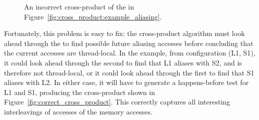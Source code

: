\begin{figure}
  \caption{An incorrect cross-product of the {\StateMachines} in
    Figure~\ref{fig:cross_product:example_aliasing}.}
  \label{fig:incorrect_cross_product}
\end{figure}

Fortunately, this problem is easy to fix: the cross-product algorithm
must look ahead through the {\StateMachines} to find possible future
aliasing accesses before concluding that the current accesses are
thread-local.  In the example, from configuration (L1, S1), it could
look ahead through the second {\StateMachine} to find that L1 aliases
with S2, and is therefore not thread-local, or it could look ahead
through the first {\StateMachine} to find that S1 aliases with L2.  In
either case, it will have to generate a happens-before test for L1 and
S1, producing the cross-product {\StateMachine} shown in
Figure~\ref{fig:correct_cross_product}.  This {\StateMachine}
correctly captures all interesting interleavings of accesses of the
memory accesses.

